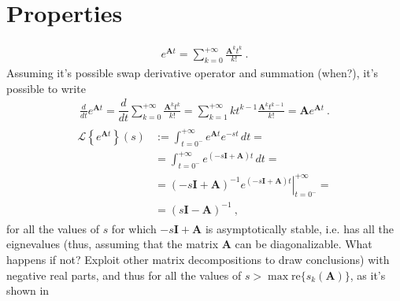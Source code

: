 \documentclass[letterpaper,10pt,english]{jupyterBook}
\begin{document}
\section{Properties}
\label{\detokenize{ch/system-theory/lti:properties}}\label{\detokenize{ch/system-theory/lti:ode-lti-matrix-properties}}
\sphinxAtStartPar
{}
\begin{equation*}
\begin{split}e^{\mathbf{A} t} = \sum_{k = 0}^{+\infty} \frac{\mathbf{A}^k t^k}{k!} \ .\end{split}
\end{equation*}
\sphinxAtStartPar
Assuming it’s possible swap derivative operator and summation (when?), it’s possible to write
\begin{equation*}
\begin{split}\frac{d}{dt} e^{\mathbf{A}t} = \dfrac{d}{dt} \sum_{k = 0}^{+\infty} \frac{\mathbf{A}^k t^k}{k!} = \sum_{k=1}^{+\infty} k t^{k-1} \frac{\mathbf{A}^k t^{k-1}}{k!} = \mathbf{A} e^{\mathbf{A} t} \ .\end{split}
\end{equation*}
\sphinxAtStartPar
{}
\begin{equation*}
\begin{split}\begin{aligned}
  \mathscr{L}\left\{ e^{\mathbf{A}t} \right\}(s)
  & := \int_{t=0^-}^{+\infty} e^{\mathbf{A} t} e^{-s t} \, dt = \\
  & = \int_{t=0^-}^{+\infty} e^{(-s\mathbf{I} + \mathbf{A}) t} \, dt = \\
  & = (-s\mathbf{I} + \mathbf{A})^{-1} \left.e^{(-s\mathbf{I} + \mathbf{A}) t}\right|_{t=0^-}^{+\infty} = \\
  & = (s \mathbf{I} - \mathbf{A})^{-1} \ ,
\end{aligned}\end{split}
\end{equation*}
\sphinxAtStartPar
for all the values of \(s\) for which \(-s\mathbf{I} + \mathbf{A}\) is asymptotically stable, i.e. has all the eignevalues (thus, assuming that the matrix \(\mathbf{A}\) can be diagonalizable. What happens if not? Exploit other matrix decompositions to draw conclusions) with negative real parts, and thus for all the values of \(s > \max \text{re}\{ s_k(\mathbf{A}) \}\), as it’s shown in {\hyperref[\detokenize{ch/system-theory/lti:matrix-stability-spectrum}]{}}
\label{ch/system-theory/lti:matrix-stability-spectrum}
\end{document}
